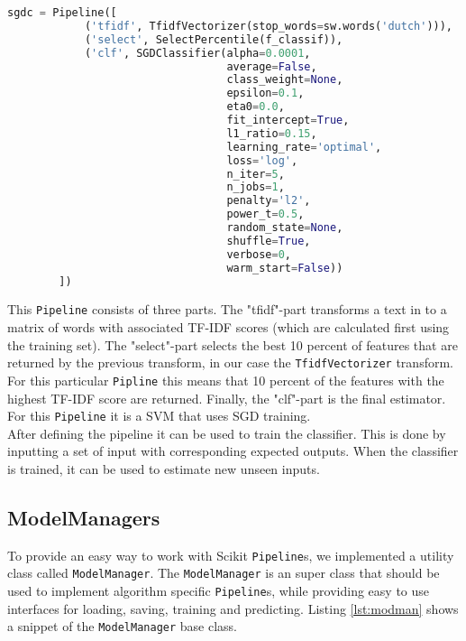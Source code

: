 \begin{lstlisting}[language=python, caption={SGDC Pipeline}, label={lst:sdgc}]
sgdc = Pipeline([
            ('tfidf', TfidfVectorizer(stop_words=sw.words('dutch'))),
            ('select', SelectPercentile(f_classif)),
            ('clf', SGDClassifier(alpha=0.0001,
                                  average=False,
                                  class_weight=None,
                                  epsilon=0.1,
                                  eta0=0.0,
                                  fit_intercept=True,
                                  l1_ratio=0.15,
                                  learning_rate='optimal',
                                  loss='log',
                                  n_iter=5,
                                  n_jobs=1,
                                  penalty='l2',
                                  power_t=0.5,
                                  random_state=None,
                                  shuffle=True,
                                  verbose=0,
                                  warm_start=False))
        ])
\end{lstlisting}
This \texttt{Pipeline} consists of three parts. The "tfidf"-part transforms a text in to a matrix of words with associated TF-IDF scores (which are calculated first using the training set). The "select"-part selects the best 10 percent of features that are returned by the previous transform, in our case the \texttt{TfidfVectorizer} transform. For this particular \texttt{Pipline} this means that 10 percent of the features with the highest TF-IDF score are returned. Finally, the "clf"-part is the final estimator. For this \texttt{Pipeline} it is a SVM that uses SGD training.\\
After defining the pipeline it can be used to train the classifier. This is done by inputting a set of input with corresponding expected outputs. When the classifier is trained, it can be used to estimate new unseen inputs. 
\subsection{ModelManagers}
To provide an easy way to work with Scikit \texttt{Pipeline}s, we implemented a utility class called \texttt{ModelManager}. The \texttt{ModelManager} is an super class that should be used to implement algorithm specific \texttt{Pipeline}s, while providing easy to use interfaces for loading, saving, training and predicting. Listing \ref{lst:modman} shows a snippet of the \texttt{ModelManager} base class.

